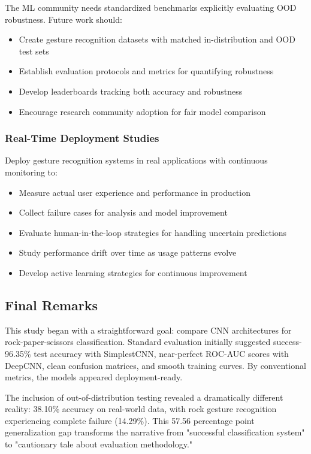 \documentclass[12pt,a4paper]{article}
\begin{document}
The ML community needs standardized benchmarks explicitly evaluating OOD robustness. Future work should:

\begin{itemize}
    \item Create gesture recognition datasets with matched in-distribution and OOD test sets
    \item Establish evaluation protocols and metrics for quantifying robustness
    \item Develop leaderboards tracking both accuracy and robustness
    \item Encourage research community adoption for fair model comparison
\end{itemize}

\subsubsection{Real-Time Deployment Studies}

Deploy gesture recognition systems in real applications with continuous monitoring to:

\begin{itemize}
    \item Measure actual user experience and performance in production
    \item Collect failure cases for analysis and model improvement
    \item Evaluate human-in-the-loop strategies for handling uncertain predictions
    \item Study performance drift over time as usage patterns evolve
    \item Develop active learning strategies for continuous improvement
\end{itemize}

\subsection{Final Remarks}

This study began with a straightforward goal: compare CNN architectures for rock-paper-scissors classification. Standard evaluation initially suggested success-96.35\% test accuracy with SimplestCNN, near-perfect ROC-AUC scores with DeepCNN, clean confusion matrices, and smooth training curves. By conventional metrics, the models appeared deployment-ready.

The inclusion of out-of-distribution testing revealed a dramatically different reality: 38.10\% accuracy on real-world data, with rock gesture recognition experiencing complete failure (14.29\%). This 57.56 percentage point generalization gap transforms the narrative from "successful classification system" to "cautionary tale about evaluation methodology."
\end{document}
